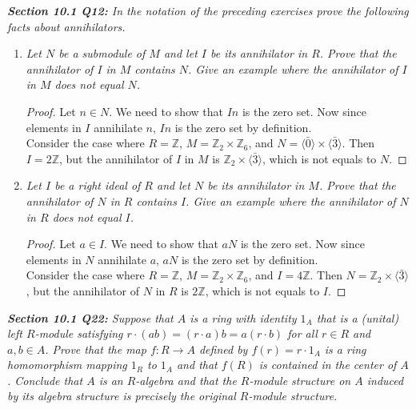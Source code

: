 \documentclass{article}
\begin{document}
\it \textbf{Section 10.1 Q12:} In the notation of the preceding exercises
  prove the following facts about annihilators.
  \begin{enumerate}[label={(\alph*)}]
    \item \it Let $N$ be a submodule of $M$ and let $I$ be its annihilator
      in $R$. Prove that the annihilator of $I$ in $M$ contains $N$. Give
      an example where the annihilator of $I$ in $M$ does not equal $N$.

      \begin{proof}
        Let $n\in N$. We need to show that $In$ is the zero set. Now since
        elements in $I$ annihilate $n$, $In$ is the zero set by definition.
        \\

        Consider the case where $R=\mathbb{Z}$,
        $M=\mathbb{Z}_2\times\mathbb{Z}_6$, and $N=\langle\bar{0}\rangle
        \times\langle\bar{3}\rangle$. Then $I=2\mathbb{Z}$, but the
        annihilator of $I$ in $M$ is
        $\mathbb{Z}_2\times\langle\bar{3}\rangle$, which is not equals to
        $N$.
      \end{proof}

    \item \it Let $I$ be a right ideal of $R$ and let $N$ be its
      annihilator in $M$. Prove that the annihilator of $N$ in $R$ contains
      $I$. Give an example where the annihilator of $N$ in $R$ does not
      equal $I$.

      \begin{proof}
        Let $a\in I$. We need to show that $aN$ is the zero set. Now since
        elements in $N$ annihilate $a$, $aN$ is the zero set by definition.
        \\

        Consider the case where $R=\mathbb{Z}$,
        $M=\mathbb{Z}_2\times\mathbb{Z}_6$, and $I=4\mathbb{Z}$. Then
        $N=\mathbb{Z}_2\times\langle\bar{3}\rangle$, but the annihilator of
        $N$ in $R$ is $2\mathbb{Z}$, which is not equals to $I$.
      \end{proof}
  \end{enumerate}

\it \textbf{Section 10.1 Q22:} Suppose that $A$ is a ring with identity
  $1_A$ that is a (unital) left $R$-module satisfying $r\cdot(ab)=(r\cdot
  a)b=a(r\cdot b)$ for all $r\in R$ and $a,b\in A$. Prove that the map
  $f:R\rightarrow A$ defined by $f(r)=r\cdot1_A$ is a ring homomorphism
  mapping $1_R$ to $1_A$ and that $f(R)$ is contained in the center of $A$.
  Conclude that $A$ is an $R$-algebra and that the $R$-module structure on
  $A$ induced by its algebra structure is precisely the original $R$-module
  structure.
\end{document}
